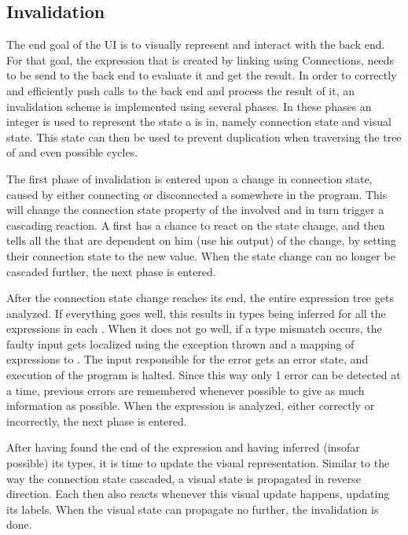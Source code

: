 \subsection{Invalidation}
The end goal of the UI is to visually represent and interact with the back end. For that goal, the expression that is created by linking  using Connections, needs to be send to the back end to evaluate it and get the result. In order to correctly and efficiently push calls to the back end and process the result of it, an invalidation scheme is implemented using several phases. In these phases an integer is used to represent the state a  is in, namely connection state and visual state. This state can then be used to prevent duplication when traversing the tree of  and even possible cycles.

The first phase of invalidation is entered upon a change in connection state, caused by either connecting or disconnected a  somewhere in the program. This will change the connection state property of the  involved and in turn trigger a cascading reaction. A  first has a chance to react on the state change, and then tells all the  that are dependent on him (use his output) of the change, by setting their connection state to the new value. When the state change can no longer be cascaded further, the next phase is entered.

After the connection state change reaches its end, the entire expression tree gets analyzed. If everything goes well, this results in types being inferred for all the expressions in each . When it does not go well, if a type mismatch occurs, the faulty input gets localized using the exception thrown and a mapping of expressions to . The input responsible for the error gets an error state, and execution of the program is halted. Since this way only 1 error can be detected at a time, previous errors are remembered whenever possible to give as much information as possible. When the expression is analyzed, either correctly or incorrectly, the next phase is entered.

After having found the end of the expression and having inferred (insofar possible) its types, it is time to update the visual representation. Similar to the way the connection state cascaded, a visual state is propagated in reverse direction. Each  then also reacts whenever this visual update happens, updating its labels. When the visual state can propagate no further, the invalidation is done.

